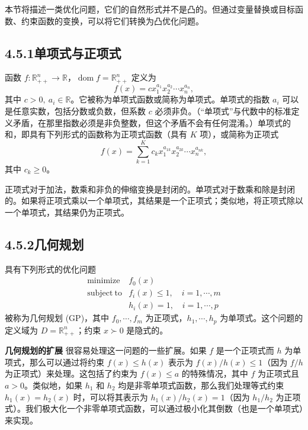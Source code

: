 \documentclass[UTF8, 12pt, fontset=fandol, oneside]{ctexart}
\begin{document}
本节将描述一类优化问题，它们的自然形式并不是凸的。但通过变量替换或目标函数、约束函数的变换，可以将它们转换为凸优化问题。

\subsection*{4.5.1\quad 单项式与正项式}

函数 $f:\mathbb{R}_{++}^n\to\mathbb{R}$，$\operatorname{dom}f=\mathbb{R}_{++}^n$ 定义为
\begin{equation}
f(x)=cx_1^{a_1}x_2^{a_2}\cdots x_n^{a_n},
\tag{4.41}
\end{equation}
其中 $c>0,\ a_i\in\mathbb{R}$。它被称为单项式函数或简称为单项式。单项式的指数 $a_i$ 可以是任意实数，包括分数或负数，但系数 $c$ 必须非负。（“单项式”与代数中的标准定义矛盾，在那里指数必须是非负整数，但这个矛盾不会有任何混淆。）单项式的和，即具有下列形式的函数称为正项式函数（具有 $K$ 项），或简称为正项式
\begin{equation}
f(x)=\sum_{k=1}^K c_k x_1^{a_{1k}}x_2^{a_{2k}}\cdots x_n^{a_{nk}},
\tag{4.42}
\end{equation}
其中 $c_k\geq 0$。

正项式对于加法，数乘和非负的伸缩变换是封闭的。单项式对于数乘和除是封闭的。如果将正项式乘以一个单项式，其结果是一个正项式；类似地，将正项式除以一个单项式，其结果仍为正项式。

\subsection*{4.5.2\quad 几何规划}

具有下列形式的优化问题
\begin{equation}
\begin{array}{ll}
\mathop{\mathrm{minimize}} & f_0(x)\\
\mathrm{subject\ to} & f_i(x)\leq 1,\quad i=1,\cdots,m\\
& h_i(x)=1,\quad i=1,\cdots,p
\end{array}
\tag{4.43}
\end{equation}
被称为几何规划 (GP)，其中 $f_0,\cdots,f_m$ 为正项式，$h_1,\cdots,h_p$ 为单项式。这个问题的定义域为 $D=\mathbb{R}_{++}^n$；约束 $x\succ 0$ 是隐式的。

\noindent\textbf{几何规划的扩展}\quad
很容易处理这一问题的一些扩展。如果 $f$ 是一个正项式而 $h$ 为单项式，那么可以通过将约束 $f(x)\leq h(x)$ 表示为 $f(x)/h(x)\leq 1$（因为 $f/h$ 为正项式）来处理。这包括了约束为 $f(x)\leq a$ 的特殊情况，其中 $f$ 为正项式且 $a>0$。类似地，如果 $h_1$ 和 $h_2$ 均是非零单项式函数，那么我们处理等式约束 $h_1(x)=h_2(x)$ 时，可以将其表示为 $h_1(x)/h_2(x)=1$（因为 $h_1/h_2$ 为正项式）。我们极大化一个非零单项式函数，可以通过极小化其倒数（也是一个单项式）来实现。
\end{document}
